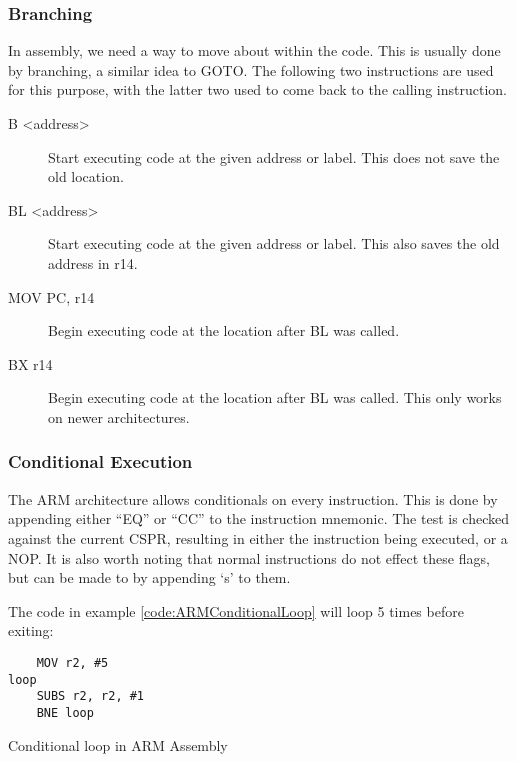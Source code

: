 			\subsubsection{Branching}
				In assembly, we need a way to move about within the code.
				This is usually done by branching, a similar idea to GOTO.
				The following two instructions are used for this purpose, with the latter two used to come back to the calling instruction.
				\begin{description}
					\item[B <address>] Start executing code at the given address or label.
						This does not save the old location.
					\item[BL <address>] Start executing code at the given address or label.
						This also saves the old address in r14.
					\item[MOV PC, r14] Begin executing code at the location after BL was called.
					\item[BX r14] Begin executing code at the location after BL was called.
						This only works on newer architectures.
				\end{description}

			\subsubsection{Conditional Execution}
				The ARM architecture allows conditionals on every instruction.
				This is done by appending either ``EQ'' or ``CC'' to the instruction mnemonic.
				The test is checked against the current CSPR, resulting in either the instruction being executed, or a NOP.
				It is also worth noting that normal instructions do not effect these flags, but can be made to by appending `s' to them.

				The code in example \ref{code:ARMConditionalLoop} will loop 5 times before exiting:
				\begin{code}
					\begin{verbatim}
	MOV r2, #5
loop
	SUBS r2, r2, #1
	BNE loop
					\end{verbatim}
					\caption{Conditional loop in ARM Assembly}
					\label{code:ARMConditionalLoop}
				\end{code}

